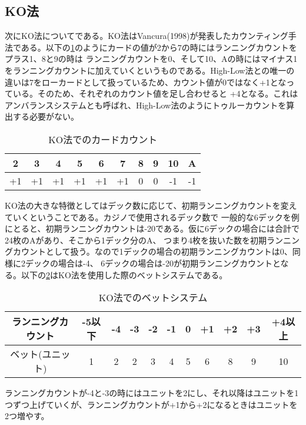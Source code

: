 \subsection{KO法}
次にKO法についてである。KO法はVancura(1998)が発表したカウンティング手法である。以下の\ref{koc}のようにカードの値が2から7の時にはランニングカウントをプラス1、8と9の時は
ランニングカウントを0、そして10、Aの時にはマイナス1をランニングカウントに加えていくというものである。High-Low法との唯一の
違いは7をローカードとして扱っているため、カウント値が0ではなく+1となっている。そのため、それぞれのカウント値を足し合わせると
+4となる。これはアンバランスシステムとも呼ばれ、High-Low法のようにトゥルーカウントを算出する必要がない。
  \begin{table}[H]
    \centering
    \label{koc}
    \caption{KO法でのカードカウント}
    \begin{tabular}{|c|c|c|c|c|c|c|c|c|c|} \hline
      2&3&4&5&6&7&8&9&10&A \\ \hline
      +1&+1&+1&+1&+1&+1&0&0&-1&-1 \\ \hline
    \end{tabular}
  \end{table}
  
KO法の大きな特徴としてはデック数に応じて、初期ランニングカウントを変えていくということである。カジノで使用されるデック数で
一般的な6デックを例にとると、初期ランニングカウントは-20である。仮に6デックの場合には合計で24枚のAがあり、そこから1デック分のA、
つまり4枚を抜いた数を初期ランニングカウントとして扱う。なので1デックの場合の初期ランニングカウントは0、同様に2デックの場合は-4、
6デックの場合は-20が初期ランニングカウントとなる。以下の\ref{kob}はKO法を使用した際のベットシステムである。

  \begin{table}[H]
    \centering
    \label{kob}
    \caption{KO法でのベットシステム}
    \begin{tabular}{|c|c|c|c|c|c|c|c|c|c|c|} \hline
      ランニングカウント&-5以下&-4&-3&-2&-1&0&+1&+2&+3&+4以上 \\ \hline
      ベット(ユニット)&1&2&2&3&4&5&6&8&9&10 \\ \hline
    \end{tabular}
  \end{table}
ランニングカウントが-4と-3の時にはユニットを2にし、それ以降はユニットを1つずつ上げていくが、ランニングカウントが+1から+2になるときはユニットを2つ増やす。

